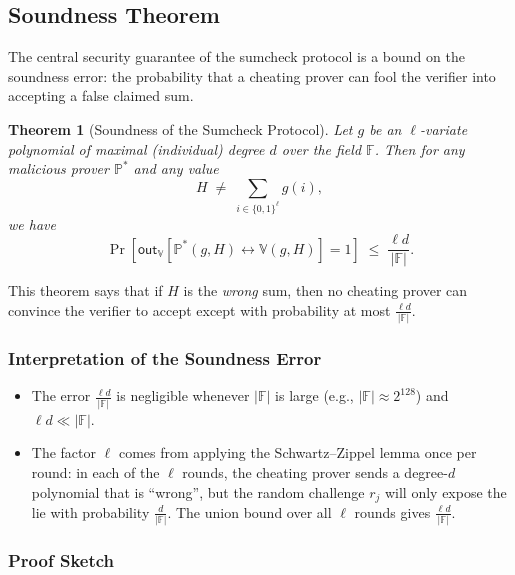 \documentclass[11pt]{article}
\theoremstyle{plain}
\newtheorem{theorem}{Theorem}[section]
\theoremstyle{definition}
\newcommand{\F}{\mathbb{F}}
\newcommand{\outV}{\mathsf{out}_\mathbb{V}}
\begin{document}
\subsection{Soundness Theorem}

The central security guarantee of the sumcheck protocol is a bound on the soundness error: the
probability that a cheating prover can fool the verifier into accepting a false claimed sum.

\begin{tcolorbox}[colback=yellow!10, colframe=orange!70!black, title={Theorem 1 (Soundness of Sumcheck)}]
  \begin{theorem}[Soundness of the Sumcheck Protocol]
    Let $g$ be an $\ell$-variate polynomial of maximal (individual) degree $d$ over the field $\F$.
    Then for any malicious prover $\mathbb{P}^*$ and any value
    \[
      H \;\neq\; \sum_{i \in \{0,1\}^\ell} g(i),
    \]
    we have
    \[
      \Pr\!\left[\outV\!\left[\mathbb{P}^*(g, H) \leftrightarrow \mathbb{V}(g, H)\right] = 1\right]
      \;\leq\; \frac{\ell d}{|\F|}.
    \]
  \end{theorem}
\end{tcolorbox}

\medskip
\noindent
This theorem says that if $H$ is the \emph{wrong} sum, then no cheating prover can convince the
verifier to accept except with probability at most $\frac{\ell d}{|\F|}$.

\subsubsection*{Interpretation of the Soundness Error}

\begin{itemize}
  \item The error $\frac{\ell d}{|\F|}$ is negligible whenever $|\F|$ is large (e.g., $|\F| \approx 2^{128}$)
        and $\ell d \ll |\F|$.
  \item The factor $\ell$ comes from applying the Schwartz--Zippel lemma once per round: in each
        of the $\ell$ rounds, the cheating prover sends a degree-$d$ polynomial that is ``wrong'',
        but the random challenge $r_j$ will only expose the lie with probability $\frac{d}{|\F|}$.
        The union bound over all $\ell$ rounds gives $\frac{\ell d}{|\F|}$.
\end{itemize}

\subsubsection*{Proof Sketch}
\end{document}
